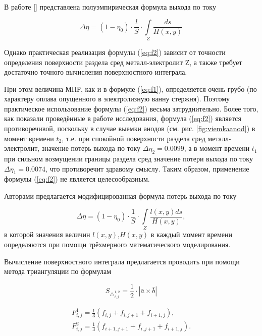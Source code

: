 \documentclass[pdflatex,sn-mathphys-gost]{pmi-jnl}
\begin{document}
В работе [\cite{litlink:derkach2}] представлена полуэмпирическая формула выхода по току

\begin{equation} \label{eq:f2}
	\Delta \eta = (1- \eta_0) \cdot \frac{l}{S} \cdot \int\limits_Z \frac{ds}{H(x,y)}
\end{equation}

Однако практическая реализация формулы (\ref{eq:f2}) зависит от точности определения поверхности раздела сред металл-электролит Z, а также требует достаточно точного вычисления поверхностного интеграла. 

При этом величина МПР, как и в формуле (\ref{eq:f1}), определяется очень грубо (по характеру оплава опущенного в электролизную ванну стержня). Поэтому практическое использование формулы (\ref{eq:f2}) весьма затруднительно. Более того, как показали проведённые в работе исследования, формула (\ref{eq:f2}) является противоречивой, поскольку в случае выемки анодов (см. рис. \ref{fig:viemkaanod}) в момент времени $t_2$, т.е. при спокойной поверхности раздела сред металл-электролит, значение  потерь выхода по току $\Delta\eta_2 = 0.0099$, а в момент времени $t_1$ при сильном возмущении границы раздела сред значение потери выхода по току $\Delta\eta_1 = 0.0074$, что противоречит здравому смыслу.  Таким образом, применение формулы (\ref{eq:f2}) не является целесообразным.

Авторами предлагается модифицированная формула потерь выхода по току 

\begin{equation} \label{eq:modf2}
	\Delta \eta = (1- \eta_0) \cdot \frac{1}{S} \cdot \int\limits_Z \frac{l(x,y) ds}{H(x,y)},
\end{equation}
в которой значения величин $l(x,y)$,$ H(x,y)$ в каждый момент времени определяются при помощи трёхмерного математического моделирования.

Вычисление поверхностного интеграла предлагается проводить при помощи метода триангуляции по формулам 

\begin{equation}\label{eq:triangsquare}
	{S_{\triangle_{i,j}^{1,2}}} = \frac{1}{2} \cdot |\bar{a} \times \bar{b}|
\end{equation}

\begin{align}
	F^1_{i,j} = \frac{1}{3}(f_{i,j}+f_{i,j+1}+f_{i+1,j}), \label{eq:triangf1}\\
	F^2_{i,j} = \frac{1}{3}(f_{i+1,j+1}+f_{i,j+1}+f_{i+1,j}). \label{eq:triangf2}
\end{align}
\end{document}
